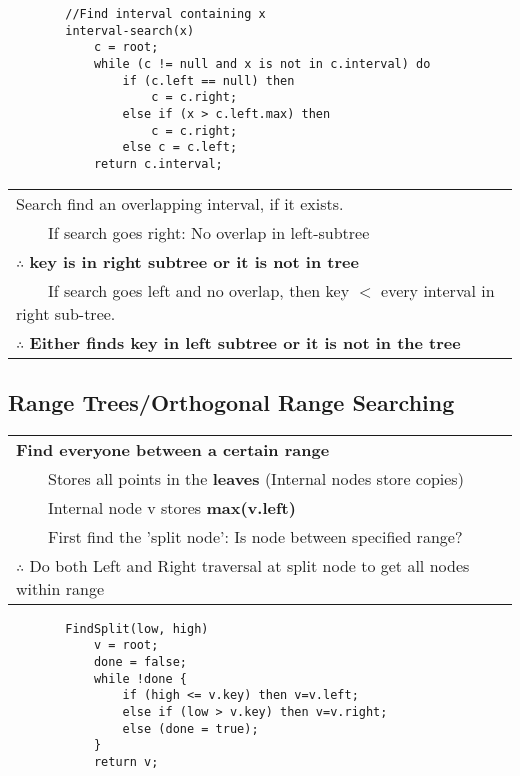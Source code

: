 \documentclass{article}
\newcommand{\tabitem}{~~\llap{\textbullet}~~}
\begin{document}
    \begin{verbatim}
        //Find interval containing x
        interval-search(x)
            c = root;
            while (c != null and x is not in c.interval) do
                if (c.left == null) then
                    c = c.right;
                else if (x > c.left.max) then
                    c = c.right;
                else c = c.left;
            return c.interval;
    \end{verbatim}

    \bigskip

    \begin{tabular}{l}
        Search find an overlapping interval, if it exists.\\
        \tabitem If search goes right: No overlap in left-subtree\\
        $\therefore$ \textbf{key is in right subtree or it is not in tree}\\
        \tabitem If search goes left and no overlap, then key $<$ every interval in right sub-tree.\\
        $\therefore$ \textbf{Either finds key in left subtree or it is not in the tree}\\
    \end{tabular}

    \pagebreak 

    \subsection{Range Trees/Orthogonal Range Searching}

    \begin{tabular}{l}
        \textbf{Find everyone between a certain range}\\
        \tabitem Stores all points in the \textbf{leaves} (Internal nodes store copies)\\
        \tabitem Internal node v stores \textbf{max(v.left)}\\
        \tabitem First find the 'split node': Is node between specified range?\\
        $\therefore$ Do both Left and Right traversal at split node to get all nodes within range\\
    \end{tabular}

    \begin{verbatim}
        FindSplit(low, high)
            v = root;
            done = false;
            while !done {
                if (high <= v.key) then v=v.left;
                else if (low > v.key) then v=v.right;
                else (done = true);
            }
            return v;
    \end{verbatim}
\end{document}
